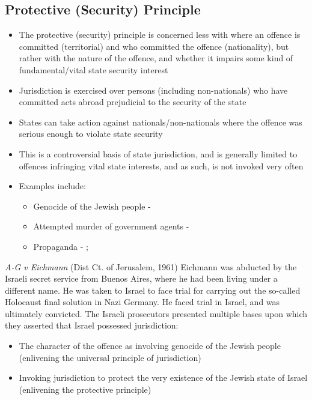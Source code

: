 \subsection{Protective (Security) Principle}
\begin{itemize}
    \item The protective (security) principle is concerned less with where an offence is committed (territorial) and who committed the offence (nationality), but rather with the nature of the offence, and whether it impairs some kind of fundamental/vital state security interest
    \item Jurisdiction is exercised over persons (including non-nationals) who have committed acts abroad prejudicial to the security of the state
    \item States can take action against nationals/non-nationals where the offence was serious enough to violate state security
    \item This is a controversial basis of state jurisdiction, and is generally limited to offences infringing vital state interests, and as such, is not invoked very often
    \item Examples include:
    \begin{itemize}
        \item Genocide of the Jewish people - 
        \item Attempted murder of government agents - 
        \item Propaganda - ; 
    \end{itemize}
\end{itemize}

\begin{casedetails}{\textit{A-G v Eichmann} (Dist Ct. of Jerusalem, 1961)}\label{case:Eichmann (protective principle)}
    \flushleft
    Eichmann was abducted by the Israeli secret service from Buenos Aires, where he had been living under a different name. He was taken to Israel to face trial for carrying out the so-called Holocaust final solution in Nazi Germany. He faced trial in Israel, and was ultimately convicted. The Israeli prosecutors presented multiple bases upon which they asserted that Israel possessed jurisdiction:
    \begin{itemize}
        \item The character of the offence as involving genocide of the Jewish people (enlivening the universal principle of jurisdiction)
        \item Invoking jurisdiction to protect the very existence of the Jewish state of Israel (enlivening the protective principle)
    \end{itemize}
\end{casedetails}

